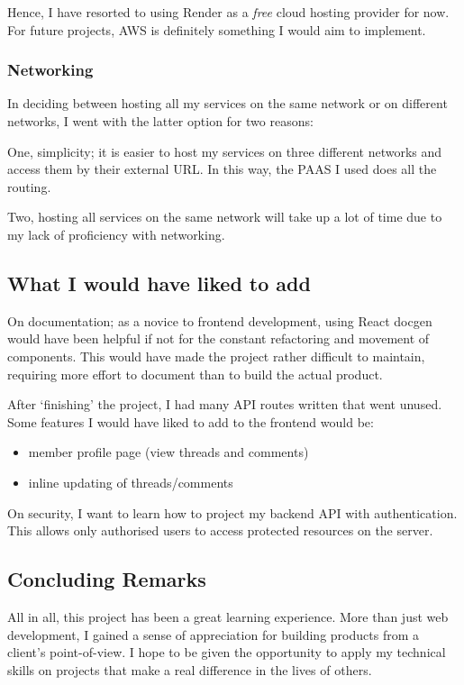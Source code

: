 \documentclass[12pt]{exam}
\begin{document}
Hence, I have resorted to using Render as a \emph{free} cloud hosting
provider for now. For future projects, AWS is definitely something I
would aim to implement.

\hypertarget{networking}{%
\subsubsection{Networking}\label{networking}}

In deciding between hosting all my services on the same network or on
different networks, I went with the latter option for two reasons:

One, simplicity; it is easier to host my services on three different
networks and access them by their external URL. In this way, the PAAS I
used does all the routing.

Two, hosting all services on the same network will take up a lot of time
due to my lack of proficiency with networking.

\hypertarget{what-i-would-have-liked-to-add}{%
\subsection{What I would have liked to
add}\label{what-i-would-have-liked-to-add}}

On documentation; as a novice to frontend development, using React
docgen would have been helpful if not for the constant refactoring and
movement of components. This would have made the project rather
difficult to maintain, requiring more effort to document than to build
the actual product.

After `finishing' the project, I had many API routes written that went
unused. Some features I would have liked to add to the frontend would
be:

\begin{itemize}
\item
  member profile page (view threads and comments)
\item
  inline updating of threads/comments
\end{itemize}

On security, I want to learn how to project my backend API with
authentication. This allows only authorised users to access protected
resources on the server.

\hypertarget{Concluding Remarks}{%
\subsection{Concluding Remarks}\label{concluding-remarks}}

All in all, this project has been a great learning experience. More than
just web development, I gained a sense of appreciation for building
products from a client's point-of-view. I hope to be given the
opportunity to apply my technical skills on projects that make a real
difference in the lives of others.
\end{document}
